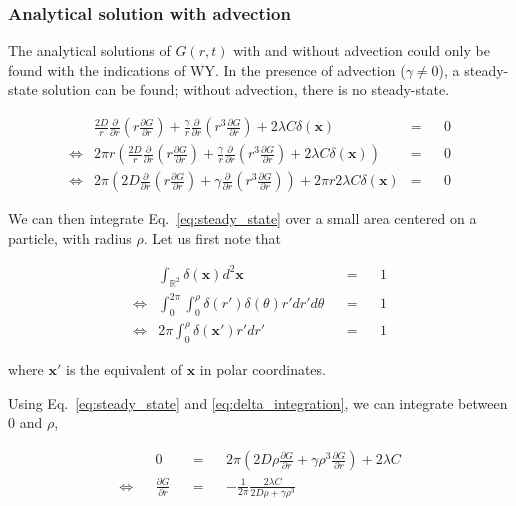 \subsubsection*{Analytical solution with advection}

The analytical solutions of $G(r,t)$ with and without advection could only be found with the indications of WY. In the presence of advection ($\gamma\neq0$), a steady-state solution
can be found; without advection, there is no steady-state. 

\begin{align}
  &  \frac{2D}{r}\frac{\partial}{\partial r}\left(r\frac{\partial G}{\partial r}\right)+\frac{\gamma}{r}\frac{\partial}{\partial r}\left(r^{3}\frac{\partial G}{\partial r}\right)+2\lambda C\delta(\boldsymbol{x})\nonumber & = & & 0 \\
\Leftrightarrow & 2\pi r\left(\frac{2D}{r}\frac{\partial}{\partial r}\left(r\frac{\partial G}{\partial r}\right)+\frac{\gamma}{r}\frac{\partial}{\partial r}\left(r^{3}\frac{\partial G}{\partial r}\right)+2\lambda C\delta(\boldsymbol{x})\right)\nonumber & = & & 0 \\
 \Leftrightarrow  & 2\pi\left(2D\frac{\partial}{\partial r}\left(r\frac{\partial G}{\partial r}\right)+\gamma\frac{\partial}{\partial r}\left(r^{3}\frac{\partial G}{\partial r}\right)\right)+2\pi r2\lambda C\delta(\boldsymbol{x}) & = & & 0\label{eq:steady_state}
\end{align}

We can then integrate Eq.~\ref{eq:steady_state} over a small
area centered on a particle, with radius $\rho$. Let us first note
that

\begin{align}
& \int_{\mathbb{R}^{2}}\delta(\boldsymbol{x})d^{2}\boldsymbol{x} & & = & & 1\nonumber \\
\Leftrightarrow & \int_{0}^{2\pi}\int_{0}^{\rho}\delta(r')\delta(\theta)r'dr'd\theta & & = & & 1\nonumber \\
\Leftrightarrow & 2\pi\int_{0}^{\rho}\delta(\boldsymbol{x'})r'dr' & & = & & 1\label{eq:delta_integration}
\end{align}

where $\boldsymbol{x'}$ is the equivalent of $\boldsymbol{x}$ in polar coordinates. 

Using Eq.~\ref{eq:steady_state} and \ref{eq:delta_integration},
we can integrate between 0 and $\rho$, 

\begin{align}
 & & 0 & & = & & 2\pi\left(2D\rho\frac{\partial G}{\partial r}+\gamma\rho^{3}\frac{\partial G}{\partial r}\right)+2\lambda C\nonumber \\
\Leftrightarrow & & \frac{\partial G}{\partial r} & & = & & -\frac{1}{2\pi}\frac{2\lambda C}{2D\rho+\gamma\rho^{3}}\label{eq:deriv_G_r}
\end{align}

